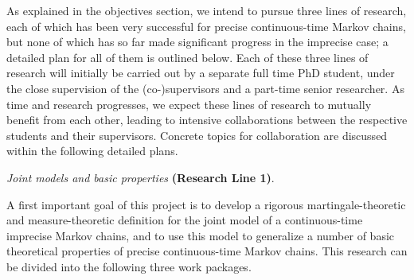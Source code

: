 \documentclass[11pt,dvipsnames,usenames,a4paper]{article}
\begin{document}
As explained in the objectives section, we intend to pursue three lines of research, each of which has been very successful for precise continuous-time Markov chains, but none of which has so far made significant progress in the imprecise case; a detailed plan for all of them is outlined below. Each of these three lines of research will initially be carried out by a separate full time PhD student, under the close supervision of the (co-)supervisors and a part-time senior researcher. As time and research progresses, we expect these lines of research to mutually benefit from each other, leading to intensive collaborations between the respective students and their supervisors. Concrete topics for collaboration are discussed within the following detailed plans.



\vspace{5pt}
\emph{Joint models and basic properties} {\bf (Research Line 1)}.
\vspace{3pt}

A first important goal of this project is to develop a rigorous martingale-theoretic and measure-theoretic definition for the joint model of a continuous-time imprecise Markov chains, and to use this model to generalize a number of basic theoretical properties of precise continuous-time Markov chains. %
This research can be divided into the following three work packages.
\end{document}
